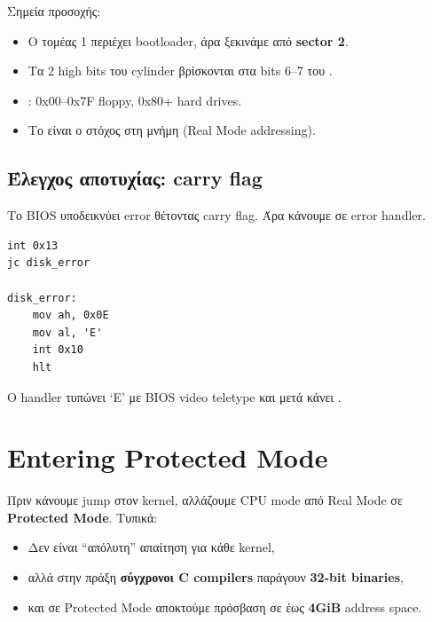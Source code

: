 \documentclass[18pt]{extarticle}
\begin{document}
Σημεία προσοχής:
\begin{itemize}
    \item Ο τομέας 1 περιέχει bootloader, άρα ξεκινάμε από \textbf{sector 2}.
    \item Τα 2 high bits του cylinder βρίσκονται στα bits 6--7 του .
    \item {}: 0x00--0x7F floppy, 0x80+ hard drives.
    \item Το  είναι ο στόχος στη μνήμη (Real Mode addressing).
\end{itemize}

\subsection{Έλεγχος αποτυχίας: carry flag}

Το BIOS υποδεικνύει error θέτοντας carry flag. Άρα κάνουμε  σε error handler.

\begin{file}
\footnotesize \begin{lstlisting}[language={[x86masm]Assembler}, tabsize=2]
int 0x13
jc disk_error

disk_error:
    mov ah, 0x0E
    mov al, 'E'
    int 0x10
    hlt
\end{lstlisting}
\end{file}

Ο handler τυπώνει ‘E’ με BIOS video teletype και μετά κάνει .


\section{Entering Protected Mode}

Πριν κάνουμε jump στον kernel, αλλάζουμε CPU mode από Real Mode σε \textbf{Protected Mode}.
Τυπικά:
\begin{itemize}
    \item Δεν είναι “απόλυτη” απαίτηση για κάθε kernel,
    \item αλλά στην πράξη \textbf{σύγχρονοι C compilers} παράγουν \textbf{32-bit binaries},
    \item και σε Protected Mode αποκτούμε πρόσβαση σε έως \textbf{4GiB} address space.
\end{itemize}
\end{document}
